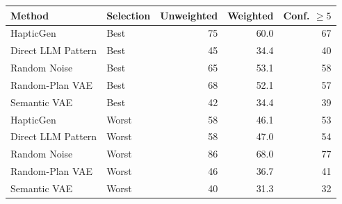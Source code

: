\begin{appendixtable}
\centering
\small
\caption{Confidence sensitivity check for best and worst selections.}
\label{tab:confidence-sensitivity}
\begin{singlespace}
\renewcommand{\arraystretch}{1.1}
\begin{tabular}{@{}>{\raggedright\arraybackslash}p{1.65in}>{\raggedright\arraybackslash}p{0.75in}rrr@{}}
\hline
\textbf{Method} & \textbf{Selection} & \textbf{Unweighted} & \textbf{Weighted} & \textbf{Conf. $\geq 5$} \\
\hline
HapticGen & Best & 75 & 60.0 & 67 \\
Direct LLM Pattern & Best & 45 & 34.4 & 40 \\
Random Noise & Best & 65 & 53.1 & 58 \\
Random-Plan VAE & Best & 68 & 52.1 & 57 \\
Semantic VAE & Best & 42 & 34.4 & 39 \\
\hline
HapticGen & Worst & 58 & 46.1 & 53 \\
Direct LLM Pattern & Worst & 58 & 47.0 & 54 \\
Random Noise & Worst & 86 & 68.0 & 77 \\
Random-Plan VAE & Worst & 46 & 36.7 & 41 \\
Semantic VAE & Worst & 40 & 31.3 & 32 \\
\hline
\end{tabular}
\end{singlespace}
\end{appendixtable}
